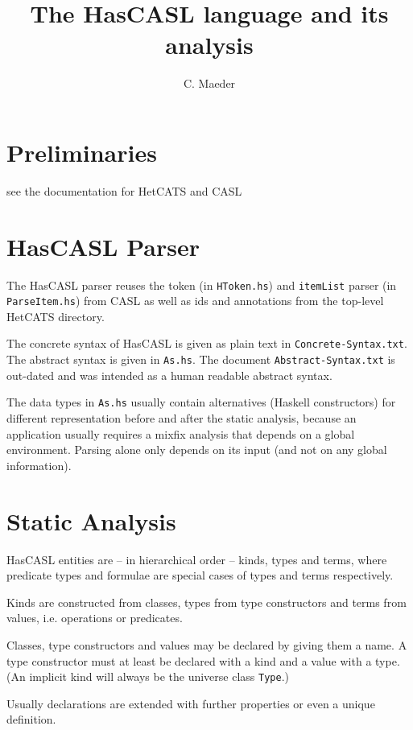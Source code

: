 \documentclass{article}
\begin{document}
\title{The HasCASL language and its analysis}

\author{C. Maeder}

\maketitle

\section{Preliminaries}

see the documentation for HetCATS and CASL

\section{HasCASL Parser}
The HasCASL parser reuses the token (in \texttt{HToken.hs}) and
\texttt{itemList} parser (in \texttt{ParseItem.hs}) from CASL as well as ids
and annotations from the top-level HetCATS directory.

The concrete syntax of HasCASL is given as plain text in
\texttt{Concrete-Syntax.txt}. The abstract syntax is given in
\texttt{As.hs}. The document \texttt{Abstract-Syntax.txt} is out-dated and was
intended as a human readable abstract syntax.

The data types in \texttt{As.hs} usually contain alternatives (Haskell
constructors) for different representation before and after the static
analysis, because an application usually requires a mixfix analysis that
depends on a global environment. Parsing alone only depends on its input
(and not on any global information).

\section{Static Analysis}

HasCASL entities are -- in hierarchical
order -- kinds, types and terms, where predicate types and formulae are
special cases of types and terms respectively.

Kinds are constructed from classes, types from type
constructors and terms from values, i.e. operations or predicates.

Classes, type constructors and values may be declared by giving them a name.
A type constructor must at least be declared with a kind and a value with a
type. (An implicit kind will always be the universe class \texttt{Type}.)

Usually declarations are extended with further properties or even a unique
definition.
\end{document}
